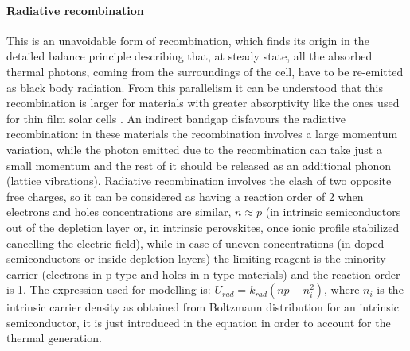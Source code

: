 		\paragraph{Radiative recombination}
		This is an unavoidable form of recombination, which finds its origin in the detailed balance principle describing that, at steady state, all the absorbed thermal photons, coming from the surroundings of the cell, have to be re-emitted as black body radiation.
		From this parallelism it can be understood that this recombination is larger for materials with greater absorptivity \cite{Nelson2003} like the ones used for thin film solar cells \cite{Tvingstedt2015}.
		An indirect bandgap disfavours the radiative recombination: in these materials the recombination involves a large momentum variation, while the photon emitted due to the recombination can take just a small momentum and the rest of it should be released as an additional phonon (lattice vibrations).
		Radiative recombination involves the clash of two opposite free charges, so it can be considered as having a reaction order of 2 when electrons and holes concentrations are similar, $n \approx p$ (in intrinsic semiconductors out of the depletion layer or, in intrinsic perovskites, once ionic profile stabilized cancelling the electric field), while in case of uneven concentrations (in doped semiconductors or inside depletion layers) the limiting reagent is the minority carrier (electrons in p-type and holes in n-type materials) and the reaction order is 1.
		The expression used for modelling is: $U_{rad} = k_{rad} (np-n_i^2)$, where $n_i$ is the intrinsic carrier density as obtained from Boltzmann distribution for an intrinsic semiconductor, it is just introduced in the equation in order to account for the thermal generation.

